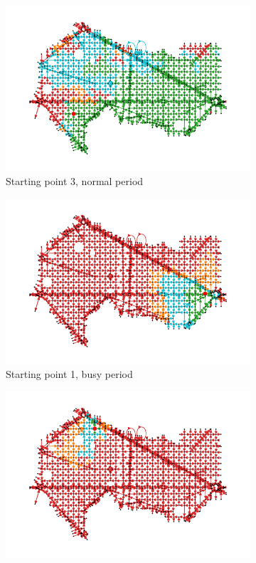 \begin{figure}[hbt!]
\begin{subfigure}[t]{0.3\linewidth}
    \includegraphics[width=\linewidth]{images/reachable/third_normal_1.png}
    \caption{Starting point 3, normal period}
    \label{fig: third normal reachalbe}
\end{subfigure}
\hfill
\begin{subfigure}[t]{0.3\linewidth}
    \centering
    \includegraphics[width=\linewidth]{images/reachable/first_busy_1.png}
    \caption{Starting point 1, busy period}
    \label{fig: first busy reachable}
\end{subfigure}
\begin{subfigure}[t]{0.3\linewidth}
    \centering
    \includegraphics[width=\linewidth]{images/reachable/second_busy_1.png}

\end{subfigure}
\end{figure}
